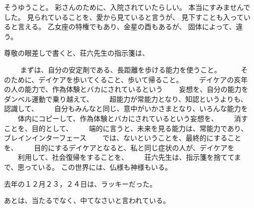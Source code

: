\documentclass{jsarticle}
\begin{document}
\title{}
\author{}
\date{}
\maketitle

     そうゆうこと。
   彩さんのために、入院されていたらしい。
   本当にすみませんでした。
   見られていることを、愛から見ていると言うが、
   見下すことも入っていると言える。
   乙女座の特権でもあり、金星の酉もあるが、
   固体によって、違う。

   尊敬の眼差しで書くと、荘六先生の指示箋は、

　　   まずは、自分の安定剤である、長距離を歩ける能力を使うこと。　
　　そのために、デイケアを歩いてくること、歩いて帰ること。
　　デイケアの亥年の人の能力で、作為体験とバカにされているという
　　妄想を、自分の能力をダンベル運動で乗り越えて、
　　超能力が常能力となり、知認というよりも、認識して、
　　自分もみんなと同じ、意中がいかさまとなり、いろんな能力を
　　体内にコピーして、作為体験とバカにされているという妄想を、
　　消すことを、目的として、
　　端的に言うと、未来を見る能力は、常能力であり、ブレインインターフェース
　　では、ないということを、最終的にすることを、
　　目的にするデイケアとなると、私と同じ症状の人が、デイケアを
　　利用して、社会復帰をすることを、
　　荘六先生は、指示箋を捨ててまで、思っている。
    この世界には、仏様も神様もいる。

    去年の１２月２３，２４日は、ラッキーだった。

    あとは、当たるでなく、中てなさいと言われている。
\end{document}
